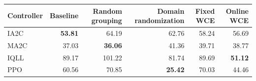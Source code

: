 \begin{tabular}{lrrrrr}
\hline
Controller & Baseline & Random grouping & Domain randomization & Fixed WCE & Online WCE \\
\hline
IA2C & \textbf{53.81} & 64.19 & 62.76 & 58.24 & 56.69 \\
MA2C & 37.03 & \textbf{36.06} & 41.36 & 39.71 & 38.77 \\
IQLL & 89.17 & 101.22 & 81.74 & 89.69 & \textbf{51.12} \\
PPO & 60.56 & 70.85 & \textbf{25.42} & 70.03 & 44.46 \\
\hline
\end{tabular}
